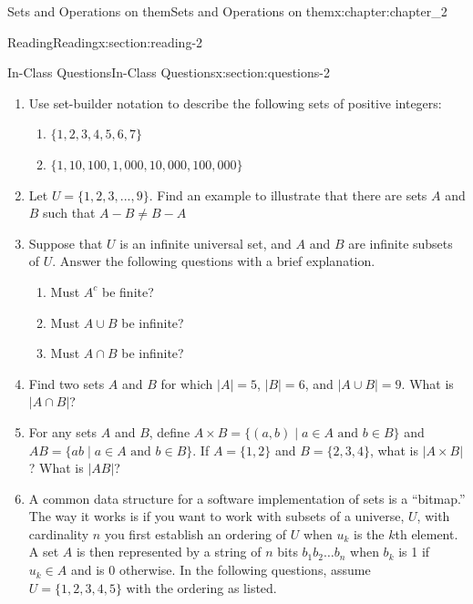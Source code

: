 \documentclass[oneside,10pt,]{book}
\numberwithin{equation}{section}
\begin{document}
\begin{chapterptx}{Sets and Operations on them}{}{Sets and Operations on them}{}{}{x:chapter:chapter_2}
\begin{sectionptx}{Reading}{}{Reading}{}{}{x:section:reading-2}
\begin{itemize}[label=\textbullet]
%
\end{itemize}
%
\end{sectionptx}
%
%
\typeout{************************************************}
\typeout{************************************************}
%
\begin{sectionptx}{In-Class Questions}{}{In-Class Questions}{}{}{x:section:questions-2}
%
\begin{enumerate}[label=\arabic*.]
\item{}Use set-builder notation to describe the following sets of positive integers:%
\begin{enumerate}[label=(\alph*)]
\item{}\(\{1, 2, 3, 4, 5, 6, 7\}\)%
\item{}\(\{1, 10, 100, 1,000, 10,000, 100,000\}\)%
\end{enumerate}
%
\item{}Let \(U= \{1, 2, 3, . . . , 9\}\).  Find an example to illustrate that there are sets \(A\) and \(B\) such that \(A - B \neq  B - A\)%
\item{}Suppose that \(U\) is an infinite universal set, and \(A\) and \(B\) are infinite subsets of \(U\). Answer the following questions with a brief explanation.%
\par
%
\begin{enumerate}[label=(\alph*)]
\item{}Must \(A^c\) be finite?%
\item{}Must \(A\cup B\) be infinite?%
\item{}Must \(A\cap B\) be infinite?%
\end{enumerate}
%
\item{}Find two sets \(A\) and \(B\) for which \(|A| = 5\), \(|B| = 6\), and \(|A\cup B| = 9\). What is \(|A \cap B|\)?%
\item{}For any sets \(A\) and \(B\), define \(A\times B = \{(a,b) \mid a\in A \text{ and } b \in B\}\) and \(AB = \{ab \mid a\in A \text{ and } b \in B\}\). If \(A = \{1,2\}\) and \(B = \{2,3,4\}\),  what is \(|A \times B|\)? What is \(|AB|\)?%
\item{}A common data structure for a software implementation of sets is a ``bitmap.''  The way it works is if you want to work with subsets of a universe, \(U\), with cardinality \(n\) you first establish an ordering of \(U\) when \(u_k\) is the \(k\)th element.  A set \(A\) is then represented by a string of \(n\) bits  \(b_1b_2\dots b_n\) when \(b_k\) is 1 if \(u_k \in A\) and is 0 otherwise. In the following questions, assume \(U=\{1,2,3,4,5\}\) with the ordering as listed.%

\end{enumerate}
\end{sectionptx}
\end{chapterptx}
\end{document}
